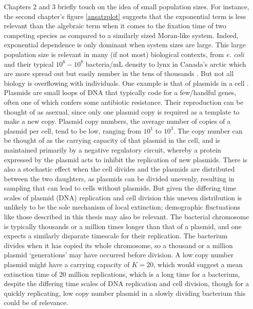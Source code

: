Chapters 2 and 3 briefly touch on the idea of small population sizes. 
For instance, the second chapter's figure \ref{ansatzplot} suggests that the exponential term is less relevant than the algebraic term when it comes to the fixation time of two competing species as compared to a similarly sized Moran-like system. 
Indeed, exponential dependence is only dominant when system sizes are large. 
This large population size is relevant in many (if not most) biological contexts, from \emph{e. coli} and their typical $10^6 - 10^8$ bacteria/mL density \cite{Lenski1991} to lynx in Canada's arctic which are more spread out but easily number in the tens of thousands \cite{Lai1996}. %
But not all biology is overflowing with individuals. 
One example is that of plasmids in a cell \cite{Gooding-townsend2015}. 
%
Plasmids are small loops of DNA that typically code for a few/handful genes, often one of which confers some antibiotic resistance\cite{Brock2006}. 
Their reproduction can be thought of as asexual, since only one plasmid copy is required as a template to make a new copy. 
Plasmid copy numbers, the average number of copies of a plasmid per cell, tend to be low, ranging from $10^1$ to $10^3$. 
The copy number can be thought of as the carrying capacity of that plasmid in the cell, and is maintained primarily by a negative regulatory circuit, whereby a protein expressed by the plasmid acts to inhibit the replication of new plasmids. 
There is also a stochastic effect when the cell divides and the plasmids are distributed between the two daughters, as plasmids can be divided unevenly, resulting in sampling that can lead to cells without plasmids. 
But given the differing time scales of plasmid (DNA) replication and cell division this uneven distribution is unlikely to be the sole mechanism of local extinction; demographic fluctuations like those described in this thesis may also be relevant. 
The bacterial chromosome is typically thousands or a million times longer than that of a plasmid, and one expects a similarly disparate timescale for their replication. 
The bacterium divides when it has copied its whole chromosome, so a thousand or a million plasmid `generations' may have occurred before division. 
A low copy number plasmid might have a carrying capacity of $K=20$, which would suggest a mean extinction time of 20 million replications, which is a long time for a bacterium, despite the differing time scales of DNA replication and cell division, though for a quickly replicating, low copy number plasmid in a slowly dividing bacterium this could be of relevance. 
